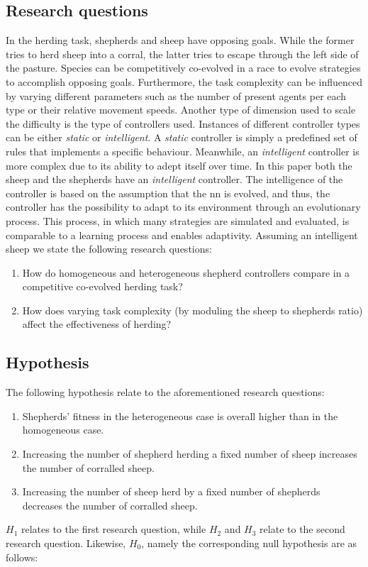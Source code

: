\documentclass[conference]{IEEEtran}
\begin{document}
\subsection{Research questions}
\label{sec:researchQuestions}
In the herding task, shepherds and sheep have opposing goals.
While the former tries to herd sheep into a corral, the latter tries to escape through the left side of the pasture. 
Species can be competitively co-evolved in a race to evolve strategies to accomplish opposing goals. 
Furthermore, the task complexity can be influenced by varying different parameters such as the number of present agents per each type or their relative movement speeds. 
Another type of dimension used to scale the difficulty is the type of controllers used.
Instances of different controller types can be either \textit{static} or \textit{intelligent}.
A \textit{static} controller is simply a predefined set of rules that implements a specific behaviour.
Meanwhile, an \textit{intelligent} controller is more complex due to its ability to adept itself over time.
In this paper both the sheep and the shepherds have an \textit{intelligent} controller.
The intelligence of the controller is based on the assumption that the \gls{nn} is evolved, and thus, the controller has the possibility to adapt to its environment through an evolutionary process. 
This process, in which many strategies are simulated and evaluated, is comparable to a learning process and enables adaptivity. 
Assuming an intelligent sheep we state the following research questions:

\begin{enumerate}
	\item How do homogeneous and heterogeneous shepherd controllers compare in a competitive co-evolved herding task?
	\item How does varying task complexity (by moduling the sheep to shepherds ratio) affect the effectiveness of herding?
\end{enumerate}

\subsection{Hypothesis}
\label{sec:hypothesis}
The following hypothesis relate to the aforementioned research questions:

\begin{enumerate}
	\item Shepherds' fitness in the heterogeneous case is overall higher than in the homogeneous case.
	\item Increasing the number of shepherd herding a fixed number of sheep increases the number of corralled sheep.
	\item Increasing the number of sheep herd by a fixed number of shepherds decreases the number of corralled sheep.
\end{enumerate}
$H_1$ relates to the first research question, while $H_2$ and $H_3$ relate to the second research question. 
Likewise, $H_0$, namely the corresponding null hypothesis are as follows:
\end{document}

